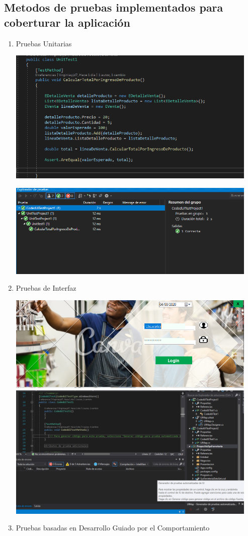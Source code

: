 \documentclass[preprint,12pt]{elsarticle}
\begin{document}
\subsection{\textbf{  Metodos de pruebas implementados para coberturar la aplicación }}
\renewcommand{\labelenumi}{{\theenumi})}
\begin{enumerate}
\item  Pruebas Unitarias  
\begin{center}
	\includegraphics[width=12cm]{./imagen/calcular} 
	\end{center}
\begin{center}
	\includegraphics[width=12cm]{./imagen/pruebas} 
	\end{center}
\item  Pruebas de Interfaz 
\begin{center}
	\includegraphics[width=12cm]{./imagen/interface} 
\includegraphics[width=12cm]{./imagen/f} 
	\end{center}
\item Pruebas basadas en Desarrollo Guiado por el Comportamiento
\end{enumerate}
\end{document}
